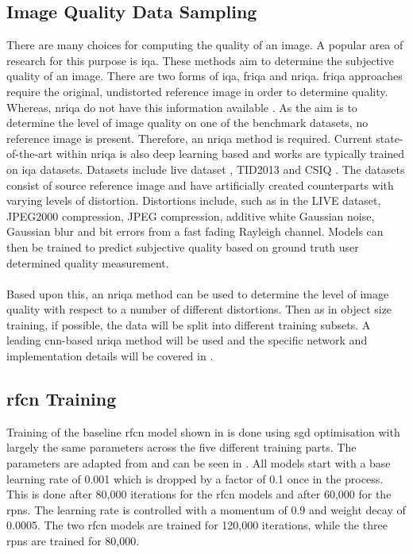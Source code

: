 \subsection{Image Quality Data Sampling}
There are many choices for computing the quality of an image. A popular area of research for this purpose is \gls{iqa}. These methods aim to determine the subjective quality of an image. There are two forms of \gls{iqa}, \gls{friqa} and \gls{nriqa}. \gls{friqa} approaches require the original, undistorted reference image in order to determine quality. Whereas, \gls{nriqa} do not have this information available \cite{deepiqa}. As the aim is to determine the level of image quality on one of the benchmark datasets, no reference image is present. Therefore, an \gls{nriqa} method is required. Current state-of-the-art within \gls{nriqa} is also deep learning based and works are typically trained on \gls{iqa} datasets. Datasets include \gls{live} dataset \cite{livepaper} \cite{liveweb}, TID2013 \cite{tid2013} and CSIQ \cite{csiq}. The datasets consist of source reference image and have artificially created counterparts with varying levels of distortion. Distortions include, such as in the LIVE dataset, JPEG2000 compression, JPEG compression, additive white Gaussian noise, Gaussian blur and bit errors from a fast fading Rayleigh channel. Models can then be trained to predict subjective quality based on ground truth user determined quality measurement.
\\\\
Based upon this, an \gls{nriqa} method can be used to determine the level of image quality with respect to a number of different distortions. Then as in object size training, if possible, the data will be split into different training subsets. A leading \gls{cnn}-based \gls{nriqa} method will be used and the specific network and implementation details will be covered in .

\subsection{\gls{rfcn} Training}
Training of the baseline \gls{rfcn} model shown in  is done using \gls{sgd} optimisation with largely the same parameters across the five different training parts. The parameters are adapted from \cite{rfcn} and can be seen in . All models start with a base learning rate of 0.001 which is dropped by a factor of 0.1 once in the process. This is done after 80,000 iterations for the \gls{rfcn} models and after 60,000 for the \glspl{rpn}. The learning rate is controlled with a momentum of 0.9 and weight decay of 0.0005. The two \gls{rfcn} models are trained for 120,000 iterations, while the three \glspl{rpn} are trained for 80,000.

